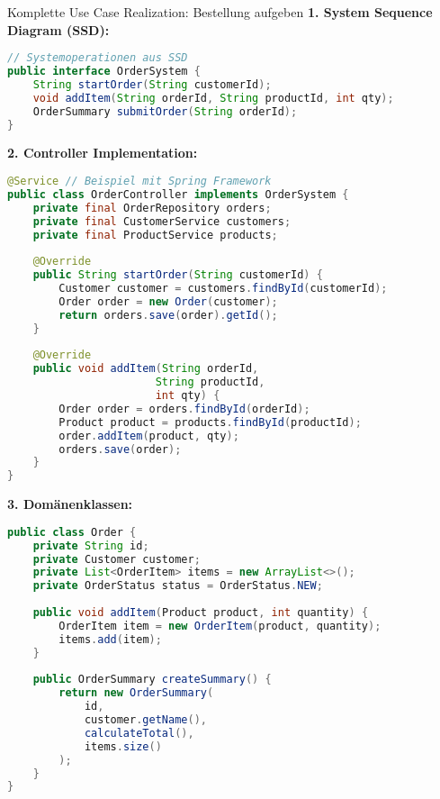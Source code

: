 \begin{example}{Komplette Use Case Realization: Bestellung aufgeben}
\textbf{1. System Sequence Diagram (SSD):}
\begin{lstlisting}[language=Java]
// Systemoperationen aus SSD
public interface OrderSystem {
    String startOrder(String customerId);
    void addItem(String orderId, String productId, int qty);
    OrderSummary submitOrder(String orderId);
}
\end{lstlisting}

\textbf{2. Controller Implementation:}
\begin{lstlisting}[language=Java]
@Service // Beispiel mit Spring Framework
public class OrderController implements OrderSystem {
    private final OrderRepository orders;
    private final CustomerService customers;
    private final ProductService products;
    
    @Override
    public String startOrder(String customerId) {
        Customer customer = customers.findById(customerId);
        Order order = new Order(customer);
        return orders.save(order).getId();
    }
    
    @Override
    public void addItem(String orderId, 
                       String productId, 
                       int qty) {
        Order order = orders.findById(orderId);
        Product product = products.findById(productId);
        order.addItem(product, qty);
        orders.save(order);
    }
}
\end{lstlisting}

\textbf{3. Domänenklassen:}
\begin{lstlisting}[language=Java]
public class Order {
    private String id;
    private Customer customer;
    private List<OrderItem> items = new ArrayList<>();
    private OrderStatus status = OrderStatus.NEW;
    
    public void addItem(Product product, int quantity) {
        OrderItem item = new OrderItem(product, quantity);
        items.add(item);
    }
    
    public OrderSummary createSummary() {
        return new OrderSummary(
            id,
            customer.getName(),
            calculateTotal(),
            items.size()
        );
    }
}
\end{lstlisting}
\end{example}

